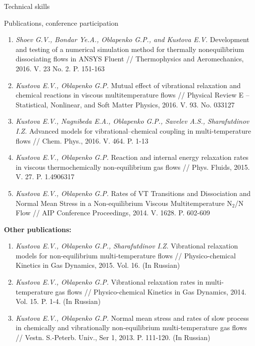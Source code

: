 \documentclass{resume} %
\begin{document}
\begin{rSection}{Technical skills}
\begin{rSection}{Publications, conference participation}
\begin{enumerate}
\item  \emph{Shoev G.V., Bondar Ye.A., Oblapenko G.P., and Kustova E.V.} Development and testing of a numerical simulation method for thermally nonequilibrium dissociating flows in ANSYS Fluent // Thermophysics and Aeromechanics, 2016. V. 23 No. 2. P. 151-163

\item  \emph{Kustova E.V., Oblapenko G.P.} Mutual effect of vibrational relaxation and chemical reactions in viscous multitemperature flows // Physical Review E -- Statistical, Nonlinear, and Soft Matter Physics, 2016. V. 93. No. 033127

\item  \emph{Kustova E.V., Nagnibeda E.A., Oblapenko G.P., Savelev A.S., Sharafutdinov I.Z.} Advanced models for vibrational–chemical coupling in multi-temperature flows // Chem. Phys., 2016. V. 464. P. 1-13

\item  \emph{Kustova E.V., Oblapenko G.P.} Reaction and internal energy relaxation rates in viscous thermochemically non-equilibrium gas flows // Phys. Fluids, 2015. V. 27. P. 1.4906317

\item  \emph{Kustova E.V., Oblapenko G.P.} Rates of VT Transitions and Dissociation and Normal Mean Stress in a Non-equilibrium Viscous Multitemperature N$_2$/N Flow // AIP Conference Proceedings, 2014. V. 1628. P. 602-609


\end{enumerate}


{\bf Other publications:}

\begin{enumerate}
    \item  \emph{Kustova E.V., Oblapenko G.P., Sharafutdinov I.Z.} Vibrational relaxation models for non-equilibrium multi-temperature flows // Physico-chemical Kinetics in Gas Dynamics, 2015. Vol. 16. (In Russian)

    \item  \emph{Kustova E.V., Oblapenko G.P.} Vibrational relaxation rates in multi-temperature gas flows // Physico-chemical Kinetics in Gas Dynamics, 2014. Vol. 15. P. 1-4. (In Russian)

    \item  \emph{Kustova E.V., Oblapenko G.P.} Normal mean stress and rates of slow process in chemically and vibrationally non-equilibrium multi-temperature gas flows // Vestn. S.-Peterb. Univ., Ser 1, 2013. P. 111-120. (In Russian)
\end{enumerate}


\end{rSection}
\end{rSection}
\end{document}
